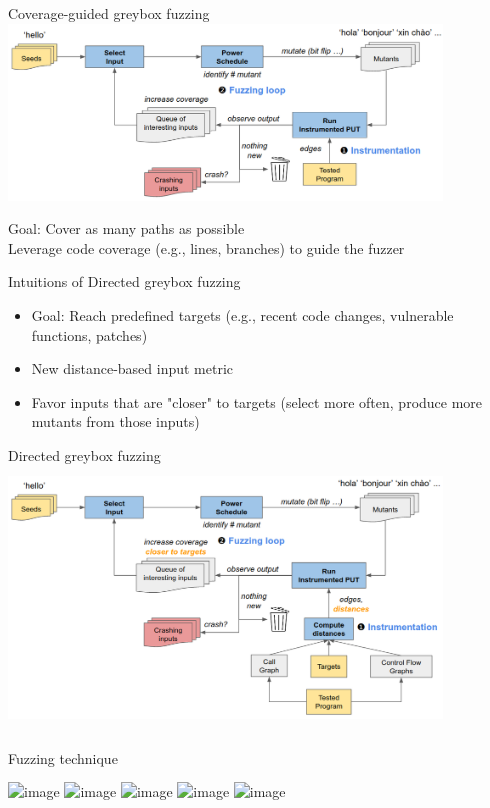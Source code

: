 \documentclass{beamer}
\begin{document}
\begin{frame}{Coverage-guided greybox fuzzing}
\includegraphics[width=11.5cm]{Figures/Fuzzing/graph2.png}

\centering Goal: Cover as many paths as possible\\
\centering Leverage code coverage (e.g., lines, branches) to guide the fuzzer
\end{frame}

\begin{frame}{Intuitions of Directed greybox fuzzing}
\begin{itemize}
\item Goal: Reach predefined targets (e.g., recent code changes, vulnerable functions, patches)
\item New distance-based input metric
\item Favor inputs that are "closer" to targets (select more often, produce more mutants from those inputs)
\end{itemize}
\end{frame}

\begin{frame}{Directed greybox fuzzing}
\includegraphics[width=11.5cm,height=7cm]{Figures/Fuzzing/graph3.png}

\end{frame}

\begin{frame}{Fuzzing technique}

\includegraphics<1>[scale=0.3]{Figures/Fuzzing/1.png}
\includegraphics<2>[scale=0.3]{Figures/Fuzzing/2.png}
\includegraphics<3>[scale=0.3]{Figures/Fuzzing/3.png}
\includegraphics<4>[scale=0.3]{Figures/Fuzzing/4.png}
\includegraphics<5>[scale=0.3]{Figures/Fuzzing/5.png}

\end{frame}
\end{document}
